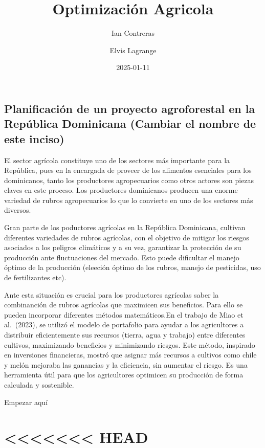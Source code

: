 \documentclass[
  letterpaper,
  DIV=11,
  numbers=noendperiod]{scrartcl}
\title{Optimización Agricola}
\author{Ian Contreras \and Elvis Lagrange}
\date{2025-01-11}
\renewcommand*\contentsname{Tabla de contenidos}
\newcommand\contentsname{Tabla de contenidos}
\begin{document}
\maketitle

\renewcommand*\contentsname{Tabla de contenidos}
{
\hypersetup{linkcolor=}
\setcounter{tocdepth}{3}
\tableofcontents
}

\subsection{Planificación de un proyecto agroforestal en la República
Dominicana (Cambiar el nombre de este
inciso)}\label{planificaciuxf3n-de-un-proyecto-agroforestal-en-la-repuxfablica-dominicana-cambiar-el-nombre-de-este-inciso}

El sector agrícola constituye uno de los sectores más importante para la
República, pues en la encargada de proveer de los alimentos esenciales
para los dominicanos, tanto los productores agropecuarios como otros
actores son piezas claves en este proceso. Los productores dominicanos
producen una enorme variedad de rubros agropecuarios lo que lo convierte
en uno de los sectores más diversos.

Gran parte de los poductores agrícolas en la República Dominicana,
cultivan diferentes variedades de rubros agrícolas, con el objetivo de
mitigar los riesgos asociados a los peligros climáticos y a su vez,
garantizar la protección de su producción ante fluctuaciones del
mercado. Esto puede dificultar el manejo óptimo de la producción
(eleeción óptimo de los rubros, manejo de pesticidas, uso de
fertilizantes etc).

Ante esta situación es crucial para los productores agrícolas saber la
combinanción de rubros agrícolas que maximicen sus beneficios. Para ello
se pueden incorporar diferentes métodos matemáticos.En el trabajo de
Miao et al.~(2023), se utilizó el modelo de portafolio para ayudar a los
agricultores a distribuir eficientemente sus recursos (tierra, agua y
trabajo) entre diferentes cultivos, maximizando beneficios y minimizando
riesgos. Este método, inspirado en inversiones financieras, mostró que
asignar más recursos a cultivos como chile y melón mejoraba las
ganancias y la eficiencia, sin aumentar el riesgo. Es una herramienta
útil para que los agricultores optimicen su producción de forma
calculada y sostenible.

Empezar aquí

\section{\textless\textless\textless\textless\textless\textless\textless{}
HEAD}\label{head}
\end{document}
